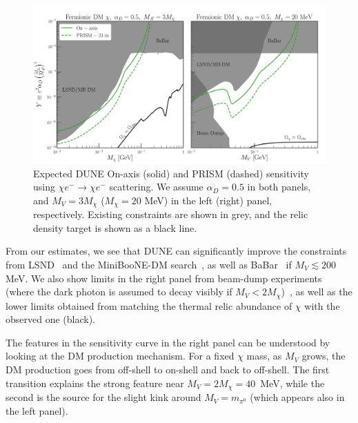  \begin{figure}[t]
 \centering
 \includegraphics[width=\linewidth]{graphics/TDR_Sensitivity.pdf}
 \caption[90$\%$ Confidence level limit for Y as a function of $m_{\chi}$ at ND]{\label{fig:chisq} Expected DUNE On-axis (solid) and PRISM (dashed) sensitivity using $\chi e^- \to \chi e^-$ scattering. We assume $\alpha_D = 0.5$ in both panels, and $M_V = 3M_\chi$ ($M_\chi = 20$ MeV) in the left (right) panel, respectively. Existing constraints are shown in grey, and the relic density target is shown as a black line.
 }
 \end{figure}

 From our estimates, we see that DUNE can significantly improve the constraints from LSND~\cite{deNiverville:2018dbu} and the MiniBooNE-DM search~\cite{Aguilar-Arevalo:2018wea}, as well as BaBar~\cite{Lees:2017lec} if $M_V \lesssim 200$ MeV. We also show limits in the right panel from beam-dump experiments (where the dark photon is assumed to decay visibly if $M_V < 2 M_\chi$)~\cite{Davier:1989wz,Batley:2015lha,Bjorken:1988as,Riordan:1987aw,Bjorken:2009mm,Bross:1989mp}, as well as the lower limits obtained from matching the thermal relic abundance of $\chi$ with the observed one (black).

The features in the sensitivity curve in the right panel can be understood by looking at the DM production mechanism.
For a fixed $\chi$ mass, as $M_V$ grows, the DM production goes from off-shell to on-shell and back to off-shell. The first transition explains the strong feature near $M_V=2M_\chi = 40$~MeV, while the second is the source for the slight kink around $M_V=m_{\pi^0}$ (which appears also in the left panel).





